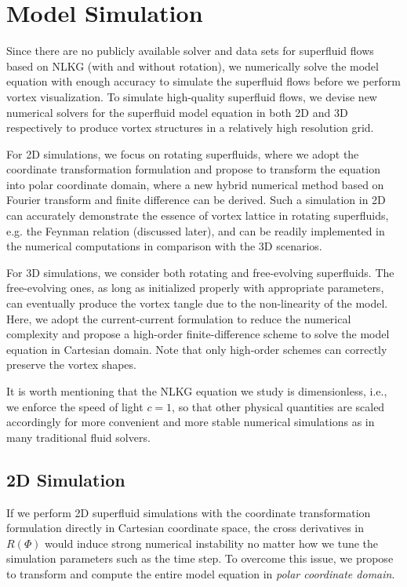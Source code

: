 \documentclass[10pt,journal,compsoc,twoside]{IEEEtran}
\newcommand{\rd}[1]{{\color[rgb]{0.0,0.0,0.0}{#1}}}
\begin{document}
	\section{Model Simulation}
	\label{sec:simulation}
	
	Since there are no publicly available solver and data sets for superfluid flows based on NLKG (with and without rotation), we \rd{first need to} numerically solve the model equation with enough accuracy to simulate the superfluid flows before we perform vortex visualization.
	To simulate high-quality superfluid flows, we devise new numerical solvers for the superfluid model equation in both 2D and 3D respectively to produce vortex structures in a relatively high resolution grid.
	
	For 2D simulations, we focus on rotating superfluids, where we adopt the coordinate transformation formulation and propose to transform the equation into polar coordinate domain, where a new hybrid numerical method based on Fourier transform and finite difference can be derived.
	Such a simulation in 2D can accurately demonstrate the essence of vortex lattice in rotating superfluids, e.g. the Feynman relation (discussed later), and can be readily implemented in the numerical computations in comparison with the 3D scenarios.
	
	For 3D simulations, we consider both rotating and free-evolving superfluids.
	The free-evolving ones, as long as initialized properly with appropriate parameters, can eventually produce the vortex tangle due to the non-linearity of the model.
	Here, we adopt the current-current formulation to reduce the numerical complexity and propose a high-order finite-difference scheme to solve the model equation in Cartesian domain.
	Note that only high-order schemes can correctly preserve the vortex shapes.
	
	
	It is worth mentioning that the NLKG equation we study is dimensionless, i.e., we enforce the speed of light $c = 1$, so that other physical quantities are scaled accordingly for more convenient and more stable numerical simulations as in many traditional fluid solvers.
	
	

	\subsection{2D Simulation}
	\label{sec:2d_simu}
	
	If we perform 2D superfluid simulations with the coordinate transformation formulation directly in Cartesian coordinate space, the cross derivatives in $R(\Phi)$ would induce strong numerical instability no matter how we tune the simulation parameters such as the time step.
	To overcome this issue, we propose to transform and compute the entire model equation in \textit{polar coordinate domain}.
	
\end{document}
